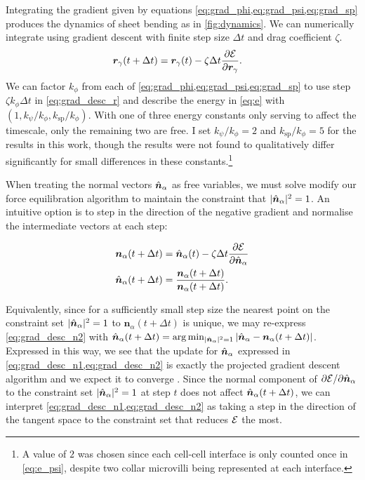 Integrating the gradient given by equations \cref{eq:grad_phi,eq:grad_psi,eq:grad_sp} produces the dynamics of sheet bending as in \cref{fig:dynamics}. 
We can numerically integrate using gradient descent with finite step size $\Delta t$ and drag coefficient $\zeta$.
\begin{align}
	\bm{r}_\gamma(t+\Delta t) &= \bm{r}_\gamma (t) - \zeta \Delta t \frac{\partial \mathcal{E}}{\partial \bm{r}_\gamma}. \label{eq:grad_desc_r}
\end{align}
We can factor $k_\phi$ from each of \cref{eq:grad_phi,eq:grad_psi,eq:grad_sp} to use step $\zeta k_\phi \Delta t$ in \cref{eq:grad_desc_r} and describe the energy in \cref{eq:e} with $(1, k_\psi / k_\phi, k_{\text{sp}} / k_\phi)$.
With one of three energy constants only serving to affect the timescale, only the remaining two are free.
I set $k_\psi / k_\phi = 2$ and $k_{\text{sp}} / k_\phi = 5$ for the results in this work, though the results were not found to qualitatively differ significantly for small differences in these constants.\footnote{A value of $2$ was chosen since each cell-cell interface is only counted once in \cref{eq:e_psi}, despite two collar microvilli being represented at each interface.}

When treating the normal vectors $\hat{\bm{n}}_\alpha$ as free variables, we must solve modify our force equilibration algorithm to maintain the constraint that $| \hat{\bm{n}}_\alpha |^2 = 1$. 
An intuitive option is to step in the direction of the negative gradient and normalise the intermediate vectors at each step:

\begin{align}
	\bm{n}_\alpha(t+\Delta t) &= \hat{\bm{n}}_\alpha(t) - \zeta \Delta t \frac{\partial \mathcal{E}}{\partial \hat{\bm{n}}_\alpha} \label{eq:grad_desc_n1}\\
	\hat{\bm{n}}_\alpha(t+\Delta t) &= \frac{\bm{n}_\alpha(t+\Delta t)}{\bm{n}_\alpha(t+\Delta t)}. \label{eq:grad_desc_n2}
\end{align}

Equivalently, since for a sufficiently small step size the nearest point on the constraint set $|\hat{\bm{n}}_\alpha|^2=1$ to $\bm{n}_\alpha(t+\Delta t)$ is unique, we may re-express \cref{eq:grad_desc_n2} with $\hat{\bm{n}}_\alpha(t + \Delta t) = \arg \min_{|\hat{\bm{n}}_\alpha|^2 = 1} |\hat{\bm{n}}_\alpha - \bm{n}_\alpha(t+\Delta t)|$.
Expressed in this way, we see that the update for $\hat{\bm{n}}_\alpha$ expressed in \cref{eq:grad_desc_n1,eq:grad_desc_n2} is exactly the projected gradient descent algorithm and we expect it to converge \citep{eicke1992}.
Since the normal component of $\partial \mathcal{E} / \partial \hat{\bm{n}}_\alpha$ to the constraint set $|\hat{\bm{n}}_\alpha|^2 = 1$ at step $t$ does not affect $\hat{\bm{n}}_\alpha(t + \Delta t)$, we can interpret \cref{eq:grad_desc_n1,eq:grad_desc_n2} as taking a step in the direction of the tangent space to the constraint set that reduces $\mathcal{E}$ the most.

